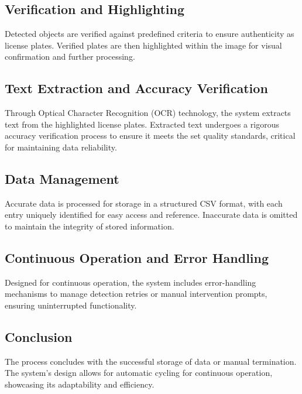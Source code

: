 \subsection{Verification and Highlighting}
Detected objects are verified against predefined criteria to ensure authenticity as license plates. Verified plates are then highlighted within the image for visual confirmation and further processing.

\subsection{Text Extraction and Accuracy Verification}
Through Optical Character Recognition (OCR) technology, the system extracts text from the highlighted license plates. Extracted text undergoes a rigorous accuracy verification process to ensure it meets the set quality standards, critical for maintaining data reliability.

\subsection{Data Management}
Accurate data is processed for storage in a structured CSV format, with each entry uniquely identified for easy access and reference. Inaccurate data is omitted to maintain the integrity of stored information.

\subsection{Continuous Operation and Error Handling}
Designed for continuous operation, the system includes error-handling mechanisms to manage detection retries or manual intervention prompts, ensuring uninterrupted functionality.

\subsection{Conclusion}
The process concludes with the successful storage of data or manual termination. The system's design allows for automatic cycling for continuous operation, showcasing its adaptability and efficiency.
